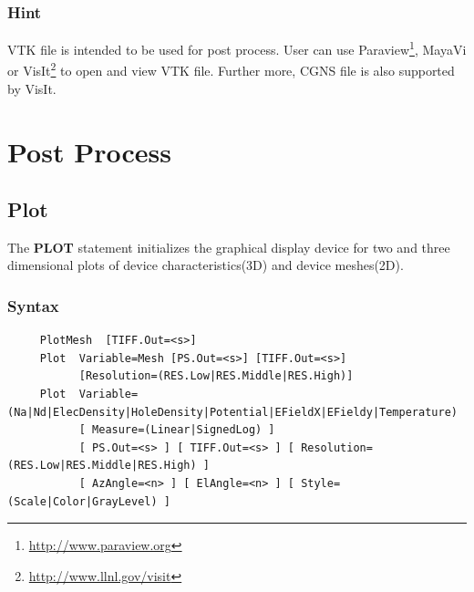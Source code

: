 \documentclass[11pt,pdftex]{article}
\begin{document}
\subsubsection*{Hint}
VTK file is intended to be used for post process. User can use
Paraview\footnote{\href{http://www.paraview.org}{http://www.paraview.org}},
MayaVi or
VisIt\footnote{\href{http://www.llnl.gov/visit}{http://www.llnl.gov/visit}}
to open and view VTK file. Further more, CGNS file is also supported
by VisIt.


\newpage
\section{Post Process}
\subsection{Plot}
The \textbf{PLOT} statement initializes the graphical display device for two and three dimensional
plots of device characteristics(3D) and device meshes(2D).

\subsubsection*{Syntax}
\begin{verbatim}
     PlotMesh  [TIFF.Out=<s>]
     Plot  Variable=Mesh [PS.Out=<s>] [TIFF.Out=<s>]
           [Resolution=(RES.Low|RES.Middle|RES.High)]
     Plot  Variable=(Na|Nd|ElecDensity|HoleDensity|Potential|EFieldX|EFieldy|Temperature)
           [ Measure=(Linear|SignedLog) ]
           [ PS.Out=<s> ] [ TIFF.Out=<s> ] [ Resolution=(RES.Low|RES.Middle|RES.High) ]
           [ AzAngle=<n> ] [ ElAngle=<n> ] [ Style=(Scale|Color|GrayLevel) ]
\end{verbatim}
\end{document}
